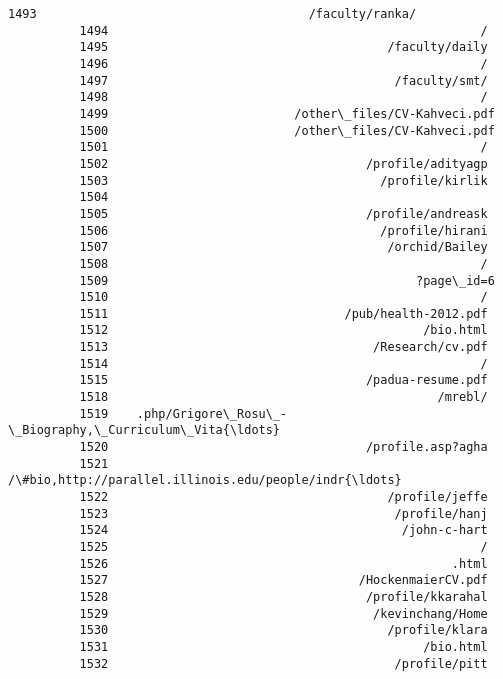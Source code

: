 \documentclass[11pt]{article}
\begin{document}
\begin{Verbatim}[commandchars=\\\{\}]
          1493                                      /faculty/ranka/
          1494                                                    /
          1495                                       /faculty/daily
          1496                                                    /
          1497                                        /faculty/smt/
          1498                                                    /
          1499                          /other\_files/CV-Kahveci.pdf
          1500                          /other\_files/CV-Kahveci.pdf
          1501                                                    /
          1502                                    /profile/adityagp
          1503                                      /profile/kirlik
          1504                                                     
          1505                                    /profile/andreask
          1506                                      /profile/hirani
          1507                                       /orchid/Bailey
          1508                                                    /
          1509                                           ?page\_id=6
          1510                                                    /
          1511                                 /pub/health-2012.pdf
          1512                                            /bio.html
          1513                                     /Research/cv.pdf
          1514                                                    /
          1515                                    /padua-resume.pdf
          1518                                              /mrebl/
          1519    .php/Grigore\_Rosu\_-\_Biography,\_Curriculum\_Vita{\ldots}
          1520                                    /profile.asp?agha
          1521    /\#bio,http://parallel.illinois.edu/people/indr{\ldots}
          1522                                       /profile/jeffe
          1523                                        /profile/hanj
          1524                                         /john-c-hart
          1525                                                    /
          1526                                                .html
          1527                                   /HockenmaierCV.pdf
          1528                                    /profile/kkarahal
          1529                                     /kevinchang/Home
          1530                                       /profile/klara
          1531                                            /bio.html
          1532                                        /profile/pitt

\end{Verbatim}
\end{document}
